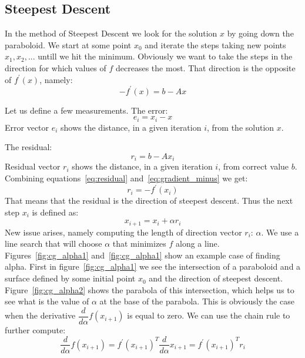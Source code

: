 \documentclass[en]{minipw} %
\begin{document}
\subsection{Steepest Descent}
In the method of Steepest Descent we look for the solution $x$ by going down the paraboloid. We start at some point $x_0$ and iterate the steps taking new points $x_1, x_2 ,...$ untill we hit the minimum. Obviously we want to take the steps in the direction for which values of $f$ decreases the most. That direction is the opposite of $f^{'}(x)$, namely:
\begin{equation}
\label{eq:gradient_minus}
-f^{'}(x) = b - Ax
\end{equation}

Let us define a few measurements. The error:
\begin{equation}
e_i = x_i - x
\end{equation}
Error vector $e_i$ shows the distance, in a given iteration $i$, from the solution $x$.

The residual:
\begin{equation}
\label{eq:residual}
r_i = b - Ax_i
\end{equation}
Residual vector $r_i$ shows the distance, in a given iteration $i$, from correct value $b$.
Combining equations~\ref{eq:residual} and~\ref{eq:gradient_minus} we get:
\begin{equation}
r_i = -f^{'}(x_i)
\end{equation}
That means that the residual is the direction of steepest descent. Thus the next step $x_i$ is defined as:
\begin{equation}
x_{i+1} = x_{i} + \alpha r_{i}
\end{equation}
New issue arises, namely computing the length of direction vector $r_{i}$: $\alpha$.
We use a line search that will choose $\alpha$ that minimizes $f$ along a line. Figures~\ref{fig:cg_alpha1} and~\ref{fig:cg_alpha1} show an example case of finding alpha. First in figure~\ref{fig:cg_alpha1} we see the intersection of a paraboloid and a surface defined by some initial point $x_0$ and the direction of steepest descent. Figure~\ref{fig:cg_alpha2} shows the parabola of this intersection, which helps us to see what is the value of $\alpha$ at the base of the parabola. This is obviously the case when the derivative $\dfrac{d}{d\alpha}f(x_{i+1})$ is equal to zero. We can use the chain rule to further compute:
\begin{equation}
\dfrac{d}{d \alpha}f(x_{i+1}) = f^{'}(x_{i+1})^{T} \dfrac{d}{d \alpha} x_{i+1} = f^{'}(x_{i+1})^{T} r_i
\end{equation}
\end{document}
